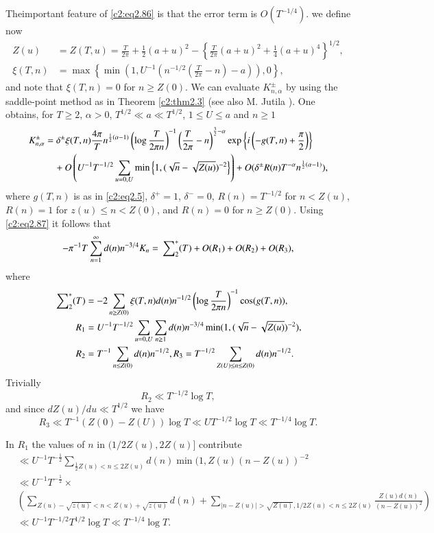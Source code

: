 The\pageoriginale important feature of \eqref{c2:eq2.86} is that the error term is
$O(T^{-1/4})$. we define now
\begin{align*}
  Z(u) & = Z(T, u) = \frac{T}{2 \pi} + \frac{1}{2} (a+u)^2 -
  \left\{\frac{T}{2 \pi} (a+u)^2 + \frac{1}{4} (a+u)^4
  \right\}^{1/2},\\
  \xi (T, n) & = \max \left\{\min (1, U^{-1} (n^{-1/2}
  \left(\frac{T}{2 \pi}-n\right) -a)), 0\right\},
\end{align*}
and note that $\xi (T, n)=0$ for $n \geq Z(0)$. We can evaluate
$K^{\pm}_{n, \alpha}$ by using the saddle-point method as in Theorem
\ref{c2:thm2.3}  (see also M. Jutila \cite{Jutila9}). One obtains, for $T
\geq 2$, $\alpha > 0$, $T^{1/2} \ll a \ll T^{1/2}$, $1 \leq U \leq a$
and $n \geq 1$
{\fontsize{10}{12}\selectfont
\begin{align}
K^{\pm}_{n, \alpha}  &= \delta^{\pm} \xi (T, n) \frac{4 \pi}{T}
  n^{\frac{1}{2} (\alpha -1)} \left(\log \frac{T}{2 \pi n} \right)^{-1}
  \left(\frac{T}{2 \pi} -n \right)^{\frac{3}{2}-\alpha}\exp  \left\{i
  \left(- g (T, n)+ \frac{\pi}{2}\right) \right\}\notag\\ 
   &\quad  + O \left(U^{-1} T^{-1/2} \sum_{u=0, U} \min \left\{1, (\sqrt{n}-
    \sqrt{Z(u)})^{-2} \right\}\right)
+ O (\delta^{\pm} R(n) T^{- \alpha} n^{\frac{1}{2} (\alpha
  -1)}), \label{c2:eq2.87} 
\end{align}}
where $g(T, n)$ is as in \eqref{c2:eq2.5}, $\delta^+ =1$,
$\delta^-=0$, $R(n) = T^{- 1/2}$ for $n < Z(u)$, $R(n)=1$ for
$z(u)\leq n < Z(0)$, and $R(n)=0$ for $n \geq Z(0)$. Using
\eqref{c2:eq2.87} it follows that 
$$
- \pi^{-1}T \sum^\infty_{n=1} d(n) n^{-3/4} K_n =\sideset{}{_2^*}\sum
(T) + O(R_1) + O(R_2) + O(R_3),
$$
where
\begin{align}
  \sideset{}{_2^*}\sum (T) & = -2 \sum_{n \geq Z(0)} \xi (T, n) d(n)
  n^{-1/2} \left(\log \frac{T}{2 \pi n} \right)^{-1} \cos (g(T,
  n)),\label{c2:eq2.88}\\
  R_1 & = U^{-1} T^{-1/2} \sum_{u=0, U} \sum_{n \geq 1} d(n) n^{-3/4}
  \min (1, (\sqrt{n}- \sqrt{Z(u)})^{-2}),\notag\\
  R_2 & = T^{-1} \sum_{n \leq Z(0)} d(n) n^{-1/2}, R_3= T^{-1/2}
  \sum_{Z(U) \leq n \leq Z(0)} d(n) n^{-1/2}.\notag
\end{align}
Trivially\pageoriginale
$$
R_2 \ll T^{-1/2} \log T,
$$
and since $dZ (u)/du \ll T^{1/2}$ we have
$$
R_3 \ll T^{-1} (Z(0)- Z(U)) \log T \ll U T^{-1/2} \log T \ll T^{-1/4}
\log T.
$$

In $R_1$ the values of $n$ in $(1/2 Z(u), 2Z(u)]$ contribute
\begin{align*}
  & \ll U^{-1} T^{-\frac{1}{2}} \sum_{\frac{1}{2} Z(u) < n \leq 2 Z(u)} d(n) \min (1,
  Z(u) (n-Z(u))^{-2}\\
  & \ll U^{-1} T^{-\frac{1}{2}}\times\\ 
  & \left( \sum_{Z(u) - \sqrt{z(u)}< n < Z (u) +
    \sqrt{z(u)}} d(n) + \sum_{|n- Z(u)| > \sqrt{Z(u)}, 1/2 Z(u) < n
    \leq 2 Z(u)}
    \frac{Z(u) d(n)}{(n - Z(u))^2}\right)\\ 
    & \ll U^{-1} T^{-1/2}
  T^{1/2} \log T \ll T^{-1/4} \log T.
\end{align*}

